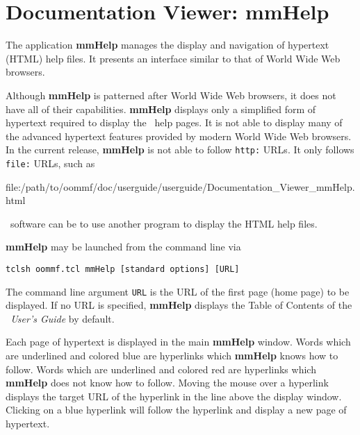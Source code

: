 \section{Documentation Viewer: mmHelp}\label{sec:mmhelp}

\begin{center}
\end{center}

The application {\bf mmHelp} manages the display and navigation of
hypertext (HTML) help files.  
It presents an interface similar
to that of World Wide Web browsers.

Although {\bf mmHelp} is patterned after World
Wide Web browsers, it does not have all of their capabilities.
{\bf mmHelp} displays only a simplified form of hypertext
required to display the \OOMMF\ help pages.
It is not able to display many of
the advanced hypertext features provided by modern World Wide Web
browsers.  In the current release, {\bf mmHelp} is not able to 
follow {\tt http:} URLs.  It only follows {\tt file:} URLs,
such as
\begin{center}
file:/path/to/oommf/doc/userguide/userguide/Documentation\_Viewer\_mmHelp.html
\end{center}
\OOMMF\ software can be  to use another program to display the HTML help
files.

{\bf mmHelp} may be launched from the command line via
\begin{verbatim}
tclsh oommf.tcl mmHelp [standard options] [URL]
\end{verbatim}
The command line argument {\tt URL} is the URL of the first
page (home page) to be displayed.  If no URL is specified,
{\bf mmHelp} displays the Table of Contents of the {\em \OOMMF\ User's
Guide} by default.

Each page of hypertext is displayed in the main {\bf mmHelp} window.
Words which are underlined and colored blue are hyperlinks which {\bf
mmHelp} knows how to follow.  Words which are underlined and colored red
are hyperlinks which {\bf mmHelp} does not know how to follow.  Moving
the mouse over a hyperlink displays the target URL of the hyperlink in
the  line above the display window.  Clicking on a blue
hyperlink will follow the hyperlink and display a new page of hypertext.

